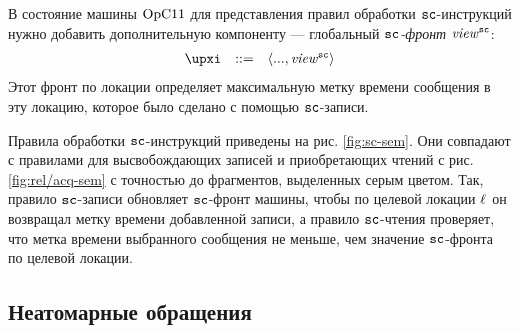 В состояние машины $\mathrm{OpC11}$ для представления правил обработки ${\mathtt{sc}}$-инструкций
нужно добавить дополнительную компоненту --- глобальный \emph{${\mathtt{sc}}$-фронт} $\mathit{view}^{\text{\scriptsize{\texttt{sc}}}}$:
\[\begin{array}{rcl}
\auxX & ::= & \angled{..., \stSC}
\end{array}\]
Этот фронт по локации определяет максимальную метку времени сообщения в эту локацию,
которое было сделано с помощью ${\mathtt{sc}}$-записи.

Правила обработки ${\mathtt{sc}}$-инструкций приведены на рис. \ref{fig:sc-sem}.
Они совпадают с правилами для высвобождающих записей и приобретающих чтений с рис. \ref{fig:rel/acq-sem}
с точностью до фрагментов, выделенных серым цветом.
Так, правило ${\mathtt{sc}}$-записи обновляет ${\mathtt{sc}}$-фронт машины, чтобы по целевой локации $\ell$ он
возвращал метку времени добавленной записи, а правило ${\mathtt{sc}}$-чтения проверяет, что метка времени
выбранного сообщения не меньше, чем значение ${\mathtt{sc}}$-фронта по целевой локации.

\subsection{Неатомарные обращения}
\label{sec:opc11:formal:na}

